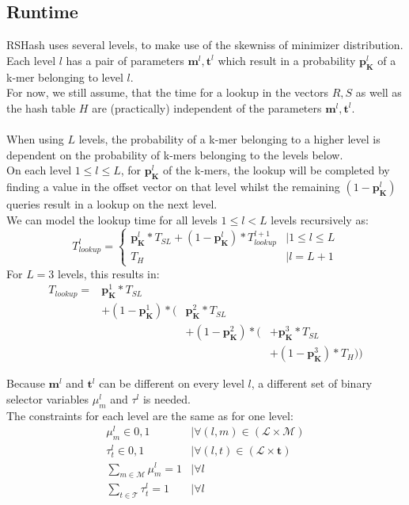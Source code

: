 \documentclass{article}
\newcommand{\lookupTime}{T_{lookup}}
\newcommand{\timeForLookupInS}{{T_{SL}}}
\newcommand{\timeForHashtable}{{T_H}}
\newcommand{\percKmers}{\textbf{p}_\textbf{K}}
\newcommand{\possibleMinimizerLength}{\mathcal{M}}
\newcommand{\possibleThresholds}{\mathcal{T}}
\newcommand{\minimizerLength}{\textbf{m}}
\newcommand{\threshold}{\textbf{t}}
\newcommand{\selectorm}{\mu}
\newcommand{\selectort}{\tau}
\newcommand{\levels}{\mathcal{L}}
\newcommand{\levelOne}{1}
\newcommand{\levelTwo}{2}
\newcommand{\levelThree}{3}
\begin{document}
\subsection*{Runtime}
RSHash uses several levels, to make use of the skewniss of minimizer distribution.\\
Each level $l$ has a pair of parameters $\minimizerLength^l, \threshold^l$ which result in a probability $\percKmers^l$ of a k-mer belonging to level $l$.\\
For now, we still assume, that the time for a lookup in the vectors $R,S$ as well as the hash table $H$ are (practically) independent of the parameters $\minimizerLength^l, \threshold^l$. \\
\\
When using $L$ levels, the probability of a k-mer belonging to a higher level is dependent on the probability of k-mers belonging to the levels below.\\
On each level $1 \leq l \leq L$, for $\percKmers^l$ of the k-mers, the lookup will be completed by finding a value in the offset vector on that level whilst the remaining $(1-\percKmers^l)$ queries result in a lookup on the next level.\\
We can model the lookup time for all levels $1\leq l<L$ levels recursively as:
\[ 
\lookupTime^l =
\begin{cases}
	\percKmers^l*\timeForLookupInS + (1-\percKmers^l)*\lookupTime^{l+1} &\mid 1\leq l \leq L\\
	\timeForHashtable &\mid l=L+1
\end{cases}
\]
For $L=3$ levels, this results in:
\[
\begin{array}{llll}
	\lookupTime =
	&\percKmers^\levelOne*\timeForLookupInS\\
	&+ (1-\percKmers^\levelOne) * \Bigg(&\percKmers^\levelTwo*\timeForLookupInS\\
			&&+(1-\percKmers^\levelTwo) * \Big( &+ \percKmers^\levelThree*\timeForLookupInS\\
				&&&+ (1-\percKmers^\levelThree) * \timeForHashtable \Big) \Bigg)
\end{array}
\]

Because $\minimizerLength^l$ and $\threshold^l$ can be different on every level $l$, a different set of binary selector variables $\selectorm^l_m$ and $\selectort^l$ is needed.\\
The constraints for each level are the same as for one level:
\[ \begin{array}{ll}
	\selectorm_m^l \in {0,1} & \mid \forall (l,m) \in (\levels \times \possibleMinimizerLength) \\
	\selectort_t^l \in {0,1} & \mid \forall (l,t) \in (\levels \times \threshold) \\
	\sum_{m \in \possibleMinimizerLength} \selectorm_m^l = 1 & \mid \forall l \\
	\sum_{t \in \possibleThresholds} \selectort_t^l = 1 & \mid \forall l
\end{array} \]
\end{document}
